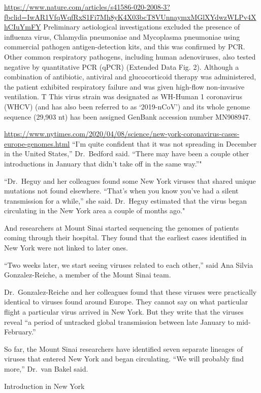 \documentclass[
]{book}
\begin{document}
\url{https://www.nature.com/articles/s41586-020-2008-3?fbclid=IwAR1VfqWqfRxS1Fi7Mh8yK4X03bcT8VUnnaymxMGlXYdwzWLPv4XhCIuYmFY}
Preliminary aetiological investigations excluded the presence of influenza virus, Chlamydia pneumoniae and Mycoplasma pneumoniae using commercial pathogen antigen-detection kits, and this was confirmed by PCR. Other common respiratory pathogens, including human adenoviruses, also tested negative by quantitative PCR (qPCR) (Extended Data Fig. 2). Although a combination of antibiotic, antiviral and glucocorticoid therapy was administered, the patient exhibited respiratory failure and was given high-flow non-invasive ventilation. T
This virus strain was designated as WH-Human 1 coronavirus (WHCV) (and has also been referred to as `2019-nCoV') and its whole genome sequence (29,903 nt) has been assigned GenBank accession number MN908947.

\url{https://www.nytimes.com/2020/04/08/science/new-york-coronavirus-cases-europe-genomes.html}
``I'm quite confident that it was not spreading in December in the United States,'' Dr.~Bedford said. ``There may have been a couple other introductions in January that didn't take off in the same way.''"

``Dr.~Heguy and her colleagues found some New York viruses that shared unique mutations not found elsewhere. ``That's when you know you've had a silent transmission for a while,'' she said.
Dr.~Heguy estimated that the virus began circulating in the New York area a couple of months ago."

And researchers at Mount Sinai started sequencing the genomes of patients coming through their hospital. They found that the earliest cases identified in New York were not linked to later ones.

``Two weeks later, we start seeing viruses related to each other,'' said Ana Silvia Gonzalez-Reiche, a member of the Mount Sinai team.

Dr.~Gonzalez-Reiche and her colleagues found that these viruses were practically identical to viruses found around Europe. They cannot say on what particular flight a particular virus arrived in New York. But they write that the viruses reveal ``a period of untracked global transmission between late January to mid-February.''

So far, the Mount Sinai researchers have identified seven separate lineages of viruses that entered New York and began circulating. ``We will probably find more,'' Dr.~van Bakel said.

Introduction in New York \citep{gonzalez-reicheIntroductionsEarlySpread2020}
\end{document}
